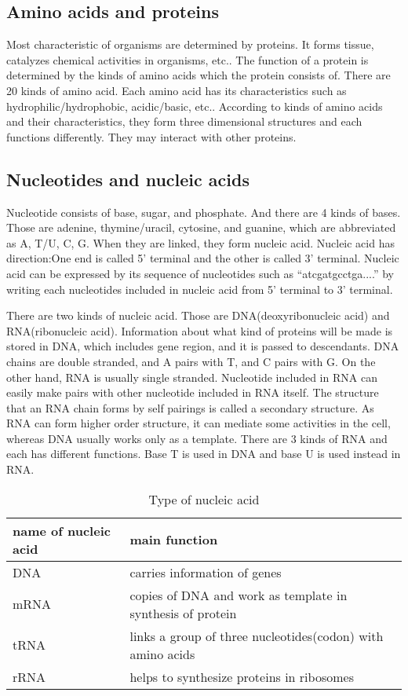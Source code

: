 \subsection{Amino acids and proteins}

Most characteristic of organisms are determined 
by proteins. It forms tissue, catalyzes chemical activities in 
organisms, etc.. The function of a protein is determined by the kinds
of amino acids which the protein consists of. There are 20 kinds of 
amino acid. Each amino acid has its characteristics such as
hydrophilic/hydrophobic, acidic/basic, etc.. According to kinds of
amino acids and their characteristics, they form three dimensional
structures and each functions differently.
They may interact with other proteins.


\subsection{Nucleotides and nucleic acids}
Nucleotide consists of base, sugar, and phosphate. And there are 4
kinds of bases. Those are adenine, thymine/uracil, cytosine, and
guanine, which are abbreviated as A, T/U, C, G. When they are linked,
they form nucleic acid. Nucleic acid has direction:One end is
called 5' terminal and the other is called 3' terminal.
Nucleic acid can be expressed by its sequence of nucleotides such
as ``atcgatgcctga....'' by writing each nucleotides included in nucleic
acid from 5' terminal to 3' terminal.

There are two kinds of nucleic
acid. Those are DNA(deoxyribonucleic acid) and RNA(ribonucleic acid).
Information about what kind of proteins will be made is stored in DNA,
which includes gene region, and it is passed to descendants.
DNA chains are double stranded, and A pairs with T, and C pairs
with G. On the other hand, RNA is usually single stranded.
Nucleotide included in RNA can easily make pairs with other nucleotide
included in RNA itself. 
The structure that an RNA chain forms by self pairings is called a
secondary structure.
As RNA can form higher order structure, it can mediate some activities
in the cell, whereas DNA usually works only as a template.
There are 3 kinds of RNA and each has different functions.
Base T is used in DNA and base U is used instead in RNA.

\begin{table}
\begin{center}
\begin{tabular}{|l|l|}
\hline
name of nucleic acid & main function\\
\hline
\hline
DNA & carries information of genes\\
\hline
mRNA & copies of DNA and work as template in synthesis of protein\\
\hline
tRNA & links a group of three nucleotides(codon) with 
amino acids \\
\hline
rRNA & helps to synthesize proteins in ribosomes\\
\hline 
\end{tabular}
\end{center}
\caption{Type of nucleic acid}  
\end{table}


